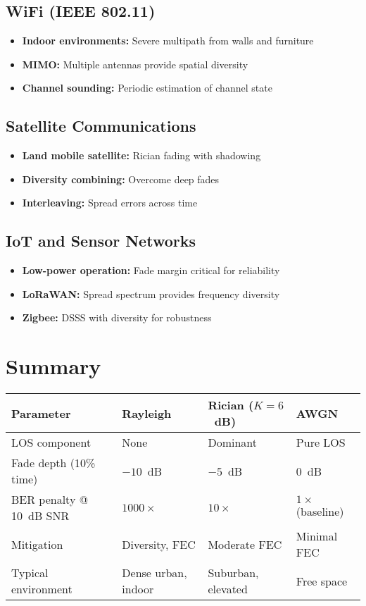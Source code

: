 \subsection{WiFi (IEEE 802.11)}
\begin{itemize}
\item \textbf{Indoor environments:} Severe multipath from walls and furniture
\item \textbf{MIMO:} Multiple antennas provide spatial diversity
\item \textbf{Channel sounding:} Periodic estimation of channel state
\end{itemize}

\subsection{Satellite Communications}
\begin{itemize}
\item \textbf{Land mobile satellite:} Rician fading with shadowing
\item \textbf{Diversity combining:} Overcome deep fades
\item \textbf{Interleaving:} Spread errors across time
\end{itemize}

\subsection{IoT and Sensor Networks}
\begin{itemize}
\item \textbf{Low-power operation:} Fade margin critical for reliability
\item \textbf{LoRaWAN:} Spread spectrum provides frequency diversity
\item \textbf{Zigbee:} DSSS with diversity for robustness
\end{itemize}

\section{Summary}

\begin{center}
\begin{tabular}{@{}llll@{}}
\toprule
\textbf{Parameter} & \textbf{Rayleigh} & \textbf{Rician ($K=6$~dB)} & \textbf{AWGN} \\
\midrule
LOS component & None & Dominant & Pure LOS \\
Fade depth (10\% time) & $-10$~dB & $-5$~dB & 0~dB \\
BER penalty @ 10~dB SNR & $1000\times$ & $10\times$ & $1\times$ (baseline) \\
Mitigation & Diversity, FEC & Moderate FEC & Minimal FEC \\
Typical environment & Dense urban, indoor & Suburban, elevated & Free space \\
\bottomrule
\end{tabular}
\end{center}

